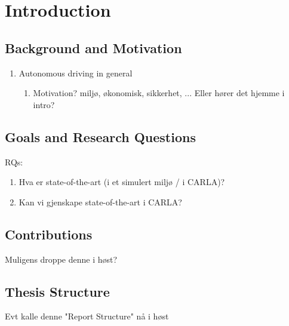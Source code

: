 \chapter{Introduction}

\section{Background and Motivation}
\begin{enumerate}
    \item Autonomous driving in general
    \begin{enumerate}
        \item Motivation? miljø, økonomisk, sikkerhet, ... Eller hører det hjemme i intro?
    \end{enumerate}
\end{enumerate}


\section{Goals and Research Questions}
RQs:
\begin{enumerate}
    \item Hva er state-of-the-art (i et simulert miljø / i CARLA)?
    \item Kan vi gjenskape state-of-the-art i CARLA?
\end{enumerate}


\section{Contributions}
Muligens droppe denne i høst?


\section{Thesis Structure}
Evt kalle denne "Report Structure" nå i høst
